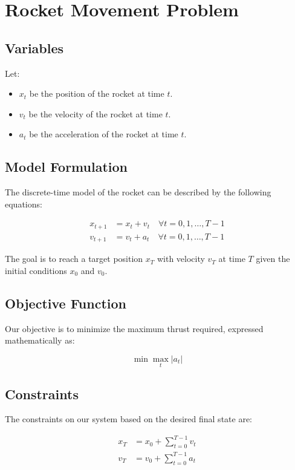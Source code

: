 \documentclass{article}
\begin{document}
\section*{Rocket Movement Problem}

\subsection*{Variables}
Let:
\begin{itemize}
    \item \( x_t \) be the position of the rocket at time \( t \).
    \item \( v_t \) be the velocity of the rocket at time \( t \).
    \item \( a_t \) be the acceleration of the rocket at time \( t \).
\end{itemize}

\subsection*{Model Formulation}
The discrete-time model of the rocket can be described by the following equations:

\begin{align}
    x_{t+1} &= x_t + v_t \quad \forall t = 0, 1, \ldots, T-1 \\
    v_{t+1} &= v_t + a_t \quad \forall t = 0, 1, \ldots, T-1
\end{align}

The goal is to reach a target position \( x_T \) with velocity \( v_T \) at time \( T \) given the initial conditions \( x_0 \) and \( v_0 \).

\subsection*{Objective Function}
Our objective is to minimize the maximum thrust required, expressed mathematically as:

\[
\min \max_{t} |a_t|
\]

\subsection*{Constraints}
The constraints on our system based on the desired final state are:

\begin{align}
    x_T &= x_0 + \sum_{t=0}^{T-1} v_t \\
    v_T &= v_0 + \sum_{t=0}^{T-1} a_t
\end{align}
\end{document}
